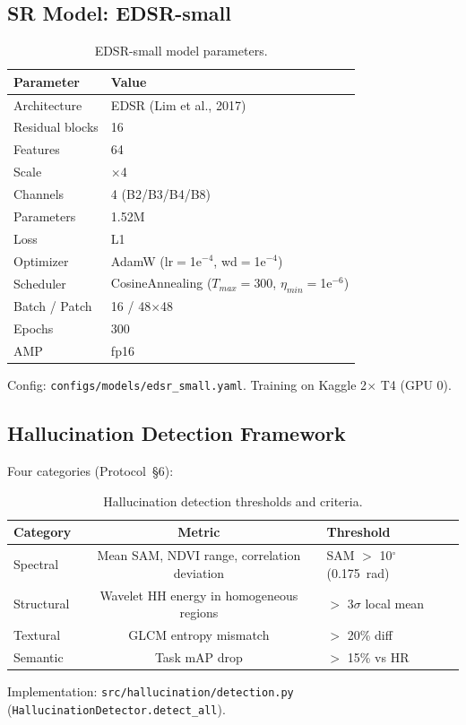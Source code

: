 \subsection{SR Model: EDSR-small}
\begin{table}[h]
\centering
\caption{EDSR-small model parameters.}
\label{tab:model}
\begin{tabular}{ll}
\toprule
Parameter & Value \\
\midrule
Architecture & EDSR (Lim et al., 2017) \\
Residual blocks & 16 \\
Features & 64 \\
Scale & $\times$4 \\
Channels & 4 (B2/B3/B4/B8) \\
Parameters & 1.52M \\
Loss & L1 \\
Optimizer & AdamW (lr$=$1e$^{-4}$, wd$=$1e$^{-4}$) \\
Scheduler & CosineAnnealing ($T_{max}$$=$300, $\eta_{min}$$=$1e$^{-6}$) \\
Batch / Patch & 16 / 48$\times$48 \\
Epochs & 300 \\
AMP & fp16 \\
\bottomrule
\end{tabular}
\end{table}
Config: \texttt{configs/models/edsr\_small.yaml}. Training on Kaggle 2$\times$ T4 (GPU 0).

\subsection{Hallucination Detection Framework}
Four categories (Protocol~§6):

\begin{table}[h]
\centering
\caption{Hallucination detection thresholds and criteria.}
\label{tab:detect}
\begin{tabular}{lcl}
\toprule
Category & Metric & Threshold \\
\midrule
Spectral & Mean SAM, NDVI range, correlation deviation & SAM $>$ 10$^\circ$ (0.175~rad) \\
Structural & Wavelet HH energy in homogeneous regions & $>$ 3$\sigma$ local mean \\
Textural & GLCM entropy mismatch & $>$ 20\% diff \\
Semantic & Task mAP drop & $>$ 15\% vs HR \\
\bottomrule
\end{tabular}
\end{table}
Implementation: \texttt{src/hallucination/detection.py} (\texttt{HallucinationDetector.detect\_all}).

